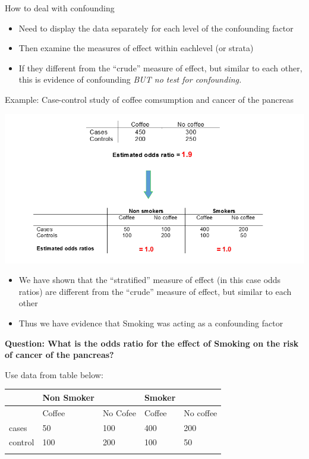 \documentclass[ignorenonframetext,]{beamer}
\begin{document}
\begin{frame}{How to deal with confounding}

\begin{itemize}
\itemsep1pt\parskip0pt
\item
  Need to display the data separately for each level of the confounding
  factor
\item
  Then examine the measures of effect within eachlevel (or strata)
\item
  If they different from the ``crude'' measure of effect, but similar to
  each other, this is evidence of confounding \emph{BUT no test for
  confounding.}
\end{itemize}

\end{frame}

\begin{frame}{Example: Case-control study of coffee comsumption and
cancer of the pancreas}

\includegraphics{coffee_cancer.png}

\end{frame}

\begin{frame}

\begin{itemize}
\itemsep1pt\parskip0pt
\item
  We have shown that the ``stratified'' measure of effect (in this case
  odds ratios) are different from the ``crude'' measure of effect, but
  similar to each other
\item
  Thus we have evidence that Smoking was acting as a confounding factor
\end{itemize}

\textbf{Question: What is the odds ratio for the effect of Smoking on
the risk of cancer of the pancreas?}

Use data from table below:

\begin{longtable}[c]{@{}lllll@{}}
\toprule
& Non Smoker & & Smoker &\tabularnewline
\midrule
\endhead
& Coffee & No Cofee & Coffee & No coffee\tabularnewline
cases & 50 & 100 & 400 & 200\tabularnewline
control & 100 & 200 & 100 & 50\tabularnewline
& & & &\tabularnewline
\bottomrule
\end{longtable}

\end{frame}
\end{document}
